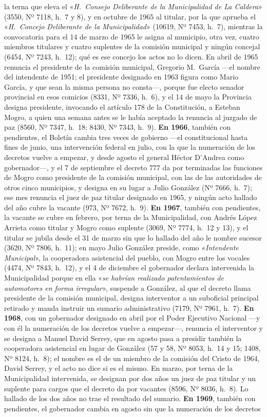 la terna que eleva el «\textit{H.\ Consejo Deliberante de la Municipalidad de La Caldera}» (3550, Nº 7118, h.\ 7 y 8), y en octubre de 1965 al titular, por la que aprueba el «\textit{H.\ Concejo Deliberante de la Municipalidad}» (10619, Nº 7453, h.\ 7), mientras la convocatoria para el 14 de marzo de 1965 le asigna al municipio, otra vez, cuatro miembros titulares y cuatro suplentes de la comisión municipal y ningún concejal (6454, Nº 7243, h.\ 12); qué es ese concejo los actos no lo dicen. En abril de 1965 renuncia el presidente de la comisión municipal, Gregorio M.\ García ---el nombre del intendente de 1951; el presidente designado en 1963 figura como Mario García, y que sean la misma persona no consta---, porque fue electo senador provincial en esos comicios (8331, Nº 7336, h.\ 6), y el 14 de mayo la Provincia designa presidente, invocando el artículo 178 de la Constitución, a Esteban Mogro, a quien una semana antes se le había aceptado la renuncia al juzgado de paz (8560, Nº 7347, h.\ 18; 8430, Nº 7343, h.\ 9). \textbf{En 1966}, también con pendientes, el Boletín cambia tres veces de gobierno ---el constitucional hasta fines de junio, una intervención federal en julio, con la que la numeración de los decretos vuelve a empezar, y desde agosto el general Héctor D'Andrea como gobernador---, y el 7 de septiembre el decreto 777 da por terminadas las funciones de Mogro como presidente de la comisión municipal, con las de las autoridades de otros cinco municipios, y designa en su lugar a Julio González (Nº 7666, h.\ 7); ese mes renuncia el juez de paz titular designado en 1965, y ningún acto hallado del año cubre la vacante (973, Nº 7672, h.\ 9). \textbf{En 1967}, también con pendientes, la vacante se cubre en febrero, por terna de la Municipalidad, con Andrés López Arrieta como titular y Mogro como suplente (3069, Nº 7774, h.\ 12 y 13), y el titular se jubila desde el 31 de marzo sin que lo hallado del año le nombre sucesor (3620, Nº 7806, h.\ 11); en mayo Julio González preside, como «\textit{Intendente Municipal}», la cooperadora asistencial del pueblo, con Mogro entre los vocales (4474, Nº 7843, h.\ 12), y el 4 de diciembre el gobernador declara intervenida la Municipalidad porque en ella «\textit{se habrían realizado patentamientos de automotores en forma irregular}», suspende a González, al que el decreto llama presidente de la comisión municipal, designa interventor a un suboficial principal retirado y manda instruir un sumario administrativo (7179, Nº 7961, h.\ 7). \textbf{En 1968}, con un gobernador designado en abril por el Poder Ejecutivo Nacional ---y con él la numeración de los decretos vuelve a empezar---, renuncia el interventor y se designa a Manuel David Serrey, que en agosto pasa a presidir también la cooperadora asistencial en lugar de González (57 y 58, Nº 8053, h.\ 14 y 15; 1408, Nº 8124, h.\ 8); el nombre es el de un miembro de la comisión del Cristo de 1964, David Serrey, y el acto no dice si es el mismo. En marzo, por terna de la Municipalidad intervenida, se designan por dos años un juez de paz titular y un suplente para cargos que el decreto da por vacantes (8596, Nº 8036, h.\ 8). Lo hallado de los dos años no trae el resultado del sumario. \textbf{En 1969}, también con pendientes, el gobernador cambia en agosto sin que la numeración de los decretos 